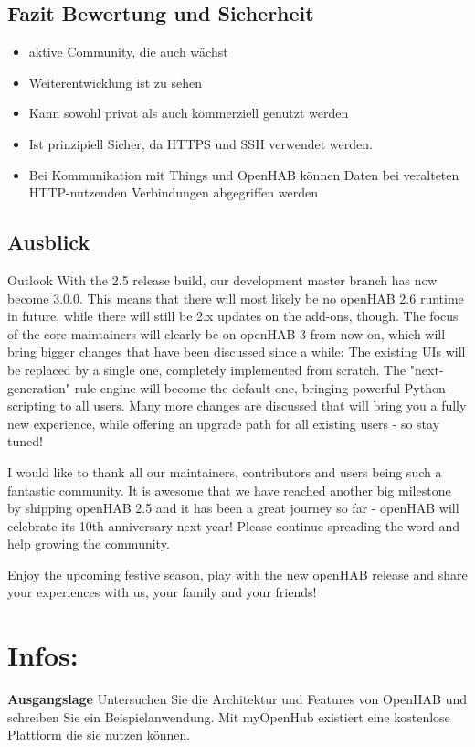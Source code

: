 \subsection{Fazit Bewertung und Sicherheit}
\begin{itemize}
	\item aktive Community, die auch wächst
	\item Weiterentwicklung ist zu sehen
	\item Kann sowohl privat als auch kommerziell genutzt werden
	
	\item Ist prinzipiell Sicher, da HTTPS und SSH verwendet werden.
	\item Bei Kommunikation mit Things und OpenHAB können Daten bei veralteten HTTP-nutzenden Verbindungen abgegriffen werden
\end{itemize}

\subsection{Ausblick}
Outlook
With the 2.5 release build, our development master branch has now become 3.0.0. This means that there will most likely be no openHAB 2.6 runtime in future, while there will still be 2.x updates on the add-ons, though. The focus of the core maintainers will clearly be on openHAB 3 from now on, which will bring bigger changes that have been discussed since a while: The existing UIs will be replaced by a single one, completely implemented from scratch. The "next-generation" rule engine will become the default one, bringing powerful Python-scripting to all users. Many more changes are discussed that will bring you a fully new experience, while offering an upgrade path for all existing users - so stay tuned!

I would like to thank all our maintainers, contributors and users being such a fantastic community. It is awesome that we have reached another big milestone by shipping openHAB 2.5 and it has been a great journey so far - openHAB will celebrate its 10th anniversary next year! Please continue spreading the word and help growing the community.

Enjoy the upcoming festive season, play with the new openHAB release and share your experiences with us, your family and your friends!


\section{Infos:}
\textbf{Ausgangslage}
Untersuchen Sie die Architektur und Features von OpenHAB und
schreiben Sie ein Beispielanwendung.
Mit myOpenHub existiert eine kostenlose Plattform die sie nutzen
können.

